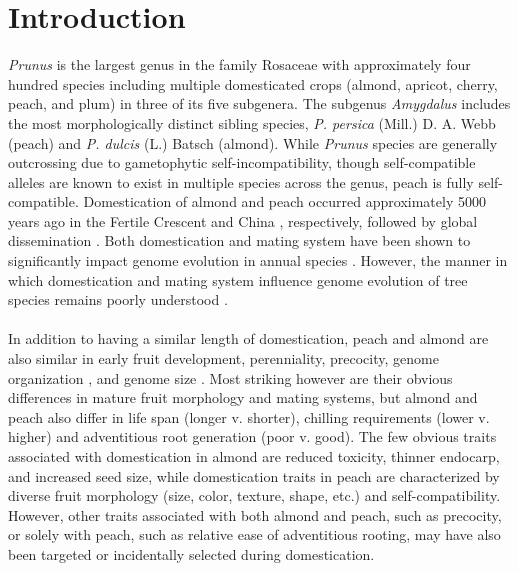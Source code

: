 \documentclass[12pt]{article}
\begin{document}
\section*{Introduction}
\emph{Prunus} is the largest genus in the family Rosaceae with approximately four hundred species including multiple domesticated crops (almond, apricot, cherry, peach, and plum) in three of its five subgenera.
%
The subgenus \emph{Amygdalus} includes the most morphologically distinct sibling species, \emph{P. persica} (Mill.) D. A. Webb (peach) and \emph{P. dulcis} (L.) Batsch (almond).
%
While \emph{Prunus} species are generally outcrossing due to gametophytic self-incompatibility, though self-compatible alleles are known to exist in multiple species across the genus, peach is fully self-compatible. 
%
Domestication of almond and peach occurred approximately 5000 years ago in the Fertile Crescent and China \citep{zohary2012domestication}, respectively, followed by global dissemination \citep{hedrick1917peaches, edwards1975almond, gradziel2011origin, zheng2014archaeological}.
%
Both domestication and mating system have been shown to significantly impact genome evolution in annual species \citep{glemin2006impact, doebley2006molecular, slotte2013capsella}. 
%
However, the manner in which domestication and mating system influence genome evolution of tree species remains poorly understood \citep{mckey2010evolutionary}.
\\
\\
%
In addition to having a similar length of domestication, peach and almond are also similar in early fruit development, perenniality, precocity, genome organization \citep{arus2012peach}, and genome size \citep{arumuganathan1991nuclear, dickson1992nuclear, baird1994estimating,  loureiro2007two}.
%
Most striking however are their obvious differences in mature fruit morphology and mating systems, but almond and peach also differ in life span (longer v. shorter), chilling requirements (lower v. higher) and adventitious root generation (poor v. good).
%
The few obvious traits associated with domestication in almond are reduced toxicity, thinner endocarp, and increased seed size, while domestication traits in peach are characterized by diverse fruit morphology (size, color, texture, shape, etc.) and self-compatibility.
%
However, other traits associated with both almond and peach, such as precocity, or solely with peach, such as relative ease of adventitious rooting, may have also been targeted or incidentally selected during domestication. 
\end{document}
